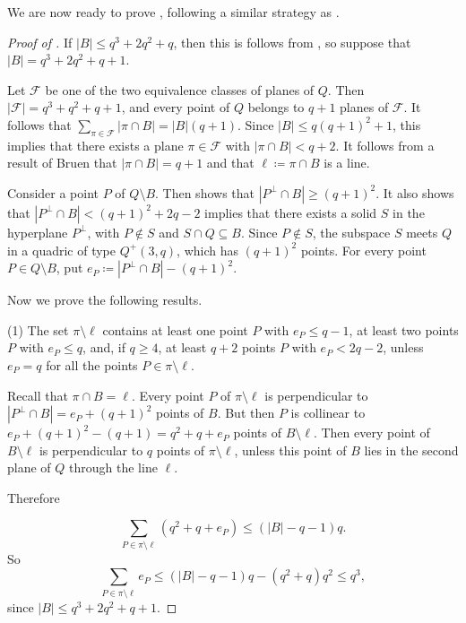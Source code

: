 \documentclass[a4paper]{article}
\theoremstyle{definition}
\begin{document}
We are now ready to prove , following a similar strategy as \cite[Theorem 3.1]{metsch2000blocking}.

\begin{proof}[Proof of ]
If $ |B|\leq q^3+2q^2+q$, then this is follows from , so suppose that $ |B|=q^3+2q^2+q+1$. 
    
Let ${\mathcal F}$ be one of the two equivalence classes of planes of $Q$. Then $ {|\mathcal F}| = q^3 + q^2 + q + 1$, and
every point of $Q$ belongs to $q + 1$ planes of ${\mathcal F}$. It follows that
$\sum_{\pi \in {\mathcal F}} |\pi \cap B| = |B|(q + 1)$. Since
$|B| \leq  q(q + 1)^2+1$, this implies that there exists a plane $\pi\in {\mathcal F}$ with $|\pi \cap B|< q + 2$. It follows
 from a result of Bruen \cite{bruen} that $|\pi \cap B| = q + 1$ and that $\ell \coloneqq \pi\cap B$ is a line.
 
Consider a point $P$ of $Q \setminus  B$. Then  shows that $|P^\perp \cap  B| \geq  (q + 1)^2$. It also shows
that $|P^\perp \cap  B | < (q + 1)^2 + 2q - 2$ implies that there exists a solid $S$ in the hyperplane
$P^\perp$, with $P \not\in S$ and $S \cap Q\subseteq B$. Since $P \not\in S$, the subspace $S$ meets $Q$ in a quadric of type
$Q^+(3, q)$, which has $ (q+ 1)^2$ points. For every point $P \in Q \setminus B$, put $e_P \coloneqq |P^\perp \cap   B | - (q+ 1)^2$.

Now we prove the following results.

\bigskip

(1) The set $\pi\setminus \ell$ contains at least one point $P$ with $e_P \leq   q - 1$, at least two points $P$ with
$e_P \leq  q$, and, if $q \geq 4$, at least $q + 2$ points $P$ with $e_P < 2q - 2$, unless $e_P=q$ for all the points $P\in\pi\setminus \ell$.

\bigskip

Recall that $\pi\cap B = \ell$. Every point $P$ of $\pi\setminus \ell$ is perpendicular to $|P^\perp\cap B|=e_P+(q+1)^2$ points of $B$. But then $P$ is collinear to $e_P+(q+1)^2-(q+1)=q^2 + q + e_P$ points of $B \setminus \ell$. Then every point of $B \setminus  \ell$  is perpendicular to $q$ points of $\pi\setminus \ell$, unless this point of $B$ lies in the second plane of $Q$ through the line $\ell$.

Therefore

\[\sum_{P\in\pi\setminus \ell}(q^2+q+e_P)\leq (|B|-q-1)q.
\]
So
\[\sum_{P\in \pi\setminus \ell}e_P\leq (|B|-q-1)q-(q^2+q)q^2\leq q^3,\]
since $|B|\leq q^3+2q^2+q+1$.


\end{proof}
\end{document}
